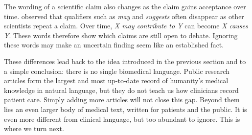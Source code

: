 \begin{reviewread}
The wording of a scientific claim also changes as the claim gains acceptance over time.
\citet{latour_laboratory_1979} observed that qualifiers such as \emph{may} and \emph{suggests} often disappear as other scientists repeat a claim.
Over time, \emph{X may contribute to Y} can become \emph{X causes Y}.
These words therefore show which claims are still open to debate.
Ignoring these words may make an uncertain finding seem like an established fact.
\end{reviewread}

\begin{reviewread}
These differences lead back to the idea introduced in the previous section and to a simple conclusion: there is no single biomedical language. %
Public research articles form the largest and most up-to-date record of humanity's medical knowledge in natural language, but they do not teach us how clinicians record patient care.
Simply adding more articles will not close this gap.
Beyond them lies an even larger body of medical text, written for patients and the public.
It is even more different from clinical language, but too abundant to ignore.
This is where we turn next.
\end{reviewread}
